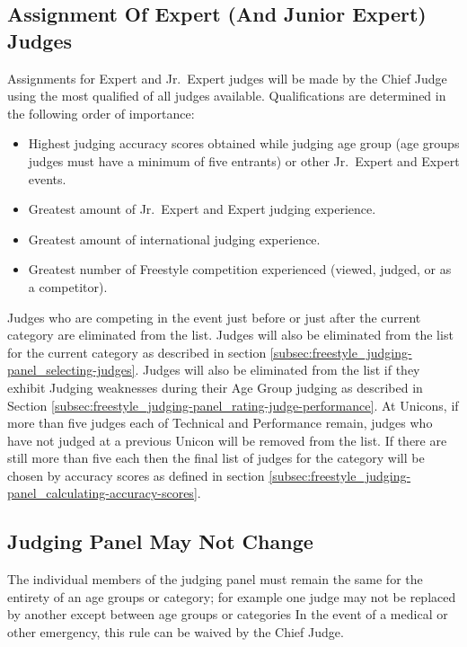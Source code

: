 \subsection{Assignment Of Expert (And Junior Expert) Judges \label{subsec:freestyle_judging-panel_assignment-of-expert-judges}} %
Assignments for Expert and Jr.~Expert judges will be made by the Chief Judge using the most qualified of all judges available.
Qualifications are determined in the following order of importance:
\begin{itemize}
\item Highest judging accuracy scores obtained while judging age group (age groups judges must have a minimum of five entrants) or other Jr.~Expert and Expert events.
\item Greatest amount of Jr.~Expert and Expert judging experience.
\item Greatest amount of international judging experience.
\item Greatest number of Freestyle competition experienced (viewed, judged, or as a competitor).
\end{itemize}
Judges who are competing in the event just before or just after the current category are eliminated from the list.
Judges will also be eliminated from the list for the current category as described in section \ref{subsec:freestyle_judging-panel_selecting-judges}.
Judges will also be eliminated from the list if they exhibit Judging weaknesses during their Age Group judging as described in Section \ref{subsec:freestyle_judging-panel_rating-judge-performance}.
At Unicons, if more than five judges each of Technical and Performance remain, judges who have not judged at a previous Unicon will be removed from the list.
If there are still more than five each then the final list of judges for the category will be chosen by accuracy scores as defined in section \ref{subsec:freestyle_judging-panel_calculating-accuracy-scores}.

\subsection{Judging Panel May Not Change}\label{subsec:freestyle_judging-panel_not-change}
The individual members of the judging panel must remain the same for the entirety of an age groups or category; for example one judge may not be replaced by another except between age groups or categories
In the event of a medical or other emergency, this rule can be waived by the Chief Judge.

